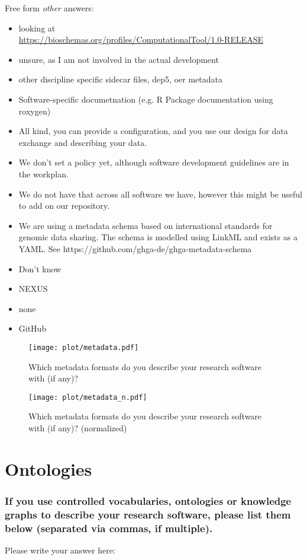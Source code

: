 \documentclass[headsepline,titlepage,twoside,12pt,toc=flat,headings=normal]{scrreprt}
\newcommand{\question}[1]{\subsubsection{#1}}
\newcommand{\otherbox}{\fbox{\phantom{This is how big an answer would be.}}}
\begin{document}
\vspace{0.1em}
Free form \emph{other} answers:
\begin{itemize}
\item looking at\\\url{https://bioschemas.org/profiles/ComputationalTool/1.0-RELEASE}
\item unsure, as I am not involved in the actual development
\item other discipline specific sidecar files, dep5, oer metadata
\item Software-specific documetnation (e.g. R Package documentation using roxygen)
\item All kind, you can provide a configuration, and you use our design for data exchange and describing your data.
\item We don't set a policy yet, although software development guidelines are in the workplan.
\item We do not have that across all software we have, however this might be useful to add on our repository.
\item We are using a metadata schema based on international standards for genomic data sharing. The schema is modelled using LinkML and exists as a YAML. See https://github.com/ghga-de/ghga-metadata-schema
\item Don't know
\item NEXUS
\item none
\item GitHub
\end{itemize}

\begin{figure}[h!]
\caption{Which metadata formats do you describe your research software with (if any)?}
\label{fig:metadata}
\texttt{[image: plot/metadata.pdf]}
\end{figure}

\begin{figure}[h!]
\caption{Which metadata formats do you describe your research software with (if any)? (normalized)}
\label{fig:metadata_n}
\texttt{[image: plot/metadata\_n.pdf]}
\end{figure}

\clearpage
\section{Ontologies}
\question{If you use controlled vocabularies, ontologies or knowledge graphs to describe your research software, please list them below (separated via commas, if multiple).}
Please write your answer here: \otherbox
\end{document}
